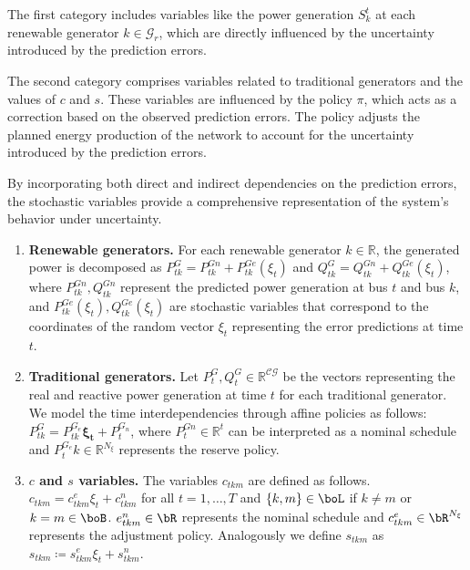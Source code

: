 \documentclass[11pt,a4paper,oneside,openany]{book}
\numberwithin{definition}{section}
\numberwithin{theorem}{section}
\numberwithin{problem}{section}
\begin{document}
The first category includes variables like the power generation $S^t_k$ at each renewable generator $k \in \mathcal{G}_r$, which are directly influenced by the uncertainty introduced by the prediction errors.

The second category comprises variables related to traditional generators and the values of $c$ and $s$. These variables are influenced by the policy $\pi$, which acts as a correction based on the observed prediction errors. The policy adjusts the planned energy production of the network to account for the uncertainty introduced by the prediction errors. 

By incorporating both direct and indirect dependencies on the prediction errors, the stochastic variables provide a comprehensive representation of the system's behavior under uncertainty.
\begin{enumerate}
    \item \textbf{Renewable generators.} For each renewable generator $k \in \mathbb{R}$, the generated power is decomposed as $P^G_{tk} = P^{Gn}_{tk} + P^{Ge}_{tk}(\xi_t)$ and $Q^G_{tk} = Q^{Gn}_{tk} + Q^{Ge}_{tk}(\xi_t)$, where $P^{Gn}_{tk}, Q^{Gn}_{tk}$ represent the predicted power generation at bus $t$ and bus $k$, and $P^{Ge}_{tk}(\xi_t), Q^{Ge}_{tk}(\xi_t)$ are stochastic variables that correspond to the coordinates of the random vector $\xi_t$ representing the error predictions at time $t$.
    \item \textbf{Traditional generators.} Let $P^G_t, Q^G_t \in \mathbb{R}^{\mathcal{CG}}$ be the vectors representing the real and reactive power generation at time $t$ for each traditional generator. We model the time interdependencies through affine policies as follows: $P^{G}_{tk} = P^{G_e}_{tk} \mathbf{\xi_{t}} + P^{G_n}_{t}$, where $P^{Gn}_{t} \in \mathbb{R}^{t}$ can be interpreted as a nominal schedule and $P^{G_e}_tk \in \mathbb{R}^{N_{\xi}}$ represents the reserve policy.
    \item \textbf{$c$ and $s$ variables.} The variables $c_{tkm}$ are defined as follows. $c_{tkm} = c^{e}_{tkm} \xi_t + c_{tkm}^{n}$  for all $t = 1,\ldots,T$ and $\{k,m\}\in \boL$ if $k\neq m$ or $k=m \in \boB$. $e_{tkm}^{n} \in \bR$ represents the nominal schedule and $c_{tkm}^e \in \bR^{N_{\xi}}$ represents the adjustment policy. Analogously we define $s_{tkm}$ as  $s_{tkm} \coloneqq s^{e}_{tkm} \xi_t + s_{tkm}^{n}$.
\end{enumerate}
\end{document}
